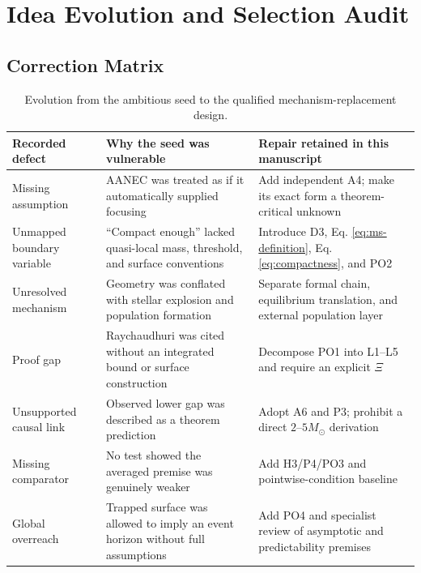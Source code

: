 \documentclass[conference]{IEEEtran}
\newcommand{\Msun}{M_{\odot}}
\begin{document}
\appendices

\section{Idea Evolution and Selection Audit}
\label{app:evolution}

\subsection{Correction Matrix}
\begin{table}[!t]
\caption{Evolution from the ambitious seed to the qualified mechanism-replacement design.}
\label{tab:evolution}
\centering
\scriptsize
\setlength{\tabcolsep}{3pt}
\begin{tabular}{p{}p{}p{}}
\toprule
\textbf{Recorded defect} & \textbf{Why the seed was vulnerable} & \textbf{Repair retained in this manuscript}\\
\midrule
Missing assumption & AANEC was treated as if it automatically supplied focusing & Add independent A4; make its exact form a theorem-critical unknown\\
Unmapped boundary variable & ``Compact enough'' lacked quasi-local mass, threshold, and surface conventions & Introduce D3, Eq. \eqref{eq:ms-definition}, Eq. \eqref{eq:compactness}, and PO2\\
Unresolved mechanism & Geometry was conflated with stellar explosion and population formation & Separate formal chain, equilibrium translation, and external population layer\\
Proof gap & Raychaudhuri was cited without an integrated bound or surface construction & Decompose PO1 into L1--L5 and require an explicit $\Xi$\\
Unsupported causal link & Observed lower gap was described as a theorem prediction & Adopt A6 and P3; prohibit a direct $2$--$5\Msun$ derivation\\
Missing comparator & No test showed the averaged premise was genuinely weaker & Add H3/P4/PO3 and pointwise-condition baseline\\
Global overreach & Trapped surface was allowed to imply an event horizon without full assumptions & Add PO4 and specialist review of asymptotic and predictability premises\\
\bottomrule
\end{tabular}
\end{table}
\end{document}
